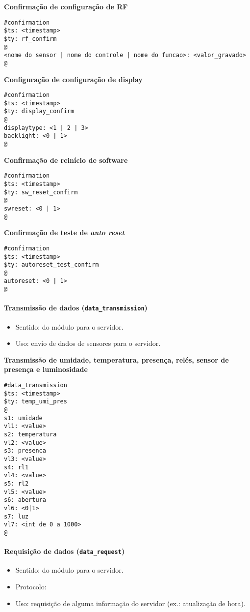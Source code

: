 \textbf{Confirmação de configuração de RF}
\begin{lstlisting}
#confirmation
$ts: <timestamp>
$ty: rf_confirm
@
<nome do sensor | nome do controle | nome do funcao>: <valor_gravado>
@
\end{lstlisting}

\textbf{Configuração de configuração de display}
\begin{lstlisting}
#confirmation
$ts: <timestamp>
$ty: display_confirm
@
displaytype: <1 | 2 | 3>
backlight: <0 | 1>
@
\end{lstlisting}

\textbf{Confirmação de reinício de software}
\begin{lstlisting}
#confirmation
$ts: <timestamp>
$ty: sw_reset_confirm
@
swreset: <0 | 1>
@
\end{lstlisting}

\textbf{Confirmação de teste de \emph{auto reset}}
\begin{lstlisting}
#confirmation
$ts: <timestamp>
$ty: autoreset_test_confirm
@
autoreset: <0 | 1>
@
\end{lstlisting}

\paragraph{Transmissão de dados (\texttt{data\_transmission})}
\begin{itemize}
\item Sentido: do módulo para o servidor.
\item Uso: envio de dados de sensores para o servidor.
\end{itemize}

\textbf{Transmissão de umidade, temperatura, presença, relés, sensor de presença e luminosidade}
\begin{lstlisting}
#data_transmission
$ts: <timestamp>
$ty: temp_umi_pres
@
s1: umidade
vl1: <value>
s2: temperatura
vl2: <value>
s3: presenca
vl3: <value>
s4: rl1
vl4: <value>
s5: rl2
vl5: <value>
s6: abertura
vl6: <0|1>
s7: luz
vl7: <int de 0 a 1000>
@
\end{lstlisting}

\paragraph{Requisição de dados (\texttt{data\_request})}
\begin{itemize}
\item Sentido: do módulo para o servidor.
\item Protocolo: \wmqtt{}
\item Uso: requisição de alguma informação do servidor (ex.: atualização de hora).
\end{itemize}



